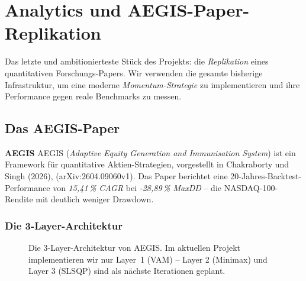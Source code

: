 
\chapter{Analytics und AEGIS-Paper-Replikation}

\label{ch:analytics}

Das letzte und ambitionierteste Stück des Projekts: die
\emph{Replikation} eines quantitativen Forschungs-Papers.
Wir verwenden die gesamte bisherige Infrastruktur, um eine
moderne \emph{Momentum-Strategie} zu implementieren und ihre
Performance gegen reale Benchmarks zu messen.

\section{Das AEGIS-Paper}

\begin{definition}
\textbf{AEGIS}
AEGIS (\emph{Adaptive Equity Generation and Immunisation System})
ist ein Framework für quantitative Aktien-Strategien, vorgestellt
in Chakraborty und Singh (2026),  (arXiv:2604.09060v1). Das Paper
berichtet eine 20-Jahres-Backtest-Performance von
\emph{15{,}41\,\% CAGR} bei \emph{-28{,}89\,\% MaxDD} -- die
NASDAQ-100-Rendite mit deutlich weniger Drawdown.
\end{definition}

\subsection{Die 3-Layer-Architektur}

\begin{figure}[ht]
\centering
{}
\caption{Die 3-Layer-Architektur von AEGIS. Im aktuellen Projekt
  implementieren wir nur Layer~1 (VAM) -- Layer 2 (Minimax) und
  Layer 3 (SLSQP) sind als nächste Iterationen geplant.}
\label{fig:aegis-layers}
\end{figure}

